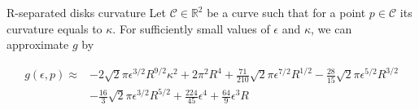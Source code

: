 \begin{claim}{R-separated disks curvature}\label{claim:r-separated-disks}
 Let $\mathcal{C} \in \mathbb{R}^2$ be a curve such that for a point $p \in \mathcal{C}$ its curvature equals to $\kappa$. For sufficiently small values of $\epsilon$ and $\kappa$, we can approximate $g$ by

\begin{align*}
g(\epsilon,p) \approx &-2 \sqrt{2}\pi \epsilon^{3/2}R^{9/2}\kappa^2 + 2\pi^2R^4 + \frac{71}{210}\sqrt{2}\pi\epsilon^{7/2}R^{1/2} - \frac{28}{15}\sqrt{2}\pi\epsilon^{5/2}R^{3/2} \\
&- \frac{16}{3}\sqrt{2}\pi\epsilon^{3/2}R^{5/2} + \frac{224}{45}\epsilon^4 + \frac{64}{9}\epsilon^3R
\end{align*} 
\end{claim}


